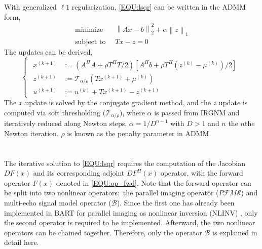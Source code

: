 \documentclass[journal,twoside,web]{ieeecolor}
\newcommand*{\norm}[1]{\left\lVert#1\right\rVert}
\begin{document}
\begin{appendices}
With generalized $\ell1$ regularization, \cref{EQU:lsqr} can be written in the ADMM form,
\begin{equation} \label{EQU:ADMM_LASSO}
\begin{split}
\textrm{minimize}\;\; &\norm{Ax - b}_2^2 + \alpha \norm{z}_1 \\
\textrm{subject to}\;\; &Tx - z = 0
\end{split}
\end{equation}
The updates can be derived,
\begin{equation} \label{EQU:ADMM_LASSO_upd}
\left\{\begin{matrix}
\begin{aligned}
x^{(k+1)} &:= (A^H A + \rho T^H T / 2) [A^H b + \rho T^H (z^{(k)} - \mu^{(k)})/2] \\ 
z^{(k+1)} &:= \mathcal{T}_{\alpha/\rho} (T x^{(k+1)} + \mu^{(k)}) \\
u^{(k+1)} &:= u^{(k)} + T x^{(k+1)} - z^{(k+1)}
\end{aligned}
\end{matrix}\right.
\end{equation}
The $x$ update is solved by the conjugate gradient method, 
and the $z$ update is computed via soft thresholding ($\mathcal{T}_{\alpha/\rho}$), 
where $\alpha$ is passed from IRGNM and iteratively reduced along Newton steps, 
$\alpha = 1/D^{n-1}$ with $D > 1$ and $n$ the $n$the Newton iteration. 
$\rho$ is known as the penalty parameter in ADMM. 

\section{}
\label{SEC:APPENDIXB}

The iterative solution to \cref{EQU:lsqr} requires the computation of the Jacobian $DF(x)$ 
and its corresponding adjoint $DF^H (x)$ operator, with the forward operator $F(x)$ denoted 
in \cref{EQU:op_fwd}. 
Note that the forward operator can be split into 
two nonlinear operators:~the parallel imaging operator ($P\mathcal{F} M \mathcal{S}$) 
and multi-echo signal model operator ($\mathcal{B}$). 
Since the first one has already been implemented 
in BART for parallel imaging as nonlinear inversion (NLINV) \cite{uecker_2008_nlinv}, 
only the second operator is required to be implemented.
Afterward, the two nonlinear operators can be chained together. 
Therefore, only the operator $\mathcal{B}$ is explained in detail here.


\end{appendices}
\end{document}
